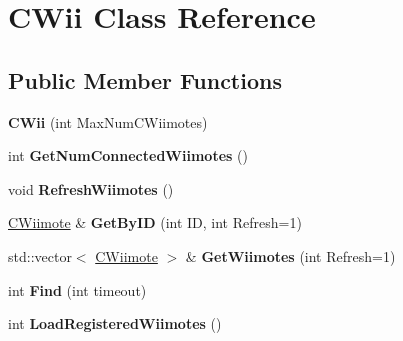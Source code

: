 \hypertarget{class_c_wii}{\section{\-C\-Wii \-Class \-Reference}
\label{class_c_wii}
}
\subsection*{\-Public \-Member \-Functions}
\begin{DoxyCompactItemize}
\item 
\hypertarget{class_c_wii_af61aa748b5c06d551d2e0ca4254f815d}{{\bfseries \-C\-Wii} (int \-Max\-Num\-C\-Wiimotes)}\label{class_c_wii_af61aa748b5c06d551d2e0ca4254f815d}

\item 
\hypertarget{class_c_wii_a0e0000682a9469cabc60b6107631fec8}{int {\bfseries \-Get\-Num\-Connected\-Wiimotes} ()}\label{class_c_wii_a0e0000682a9469cabc60b6107631fec8}

\item 
\hypertarget{class_c_wii_a1ad5ec6adb3939eb2bda5596fb7d6f4a}{void {\bfseries \-Refresh\-Wiimotes} ()}\label{class_c_wii_a1ad5ec6adb3939eb2bda5596fb7d6f4a}

\item 
\hypertarget{class_c_wii_aed6eb96fc61d08154aee79852def620c}{\hyperlink{class_c_wiimote}{\-C\-Wiimote} \& {\bfseries \-Get\-By\-I\-D} (int \-I\-D, int \-Refresh=1)}\label{class_c_wii_aed6eb96fc61d08154aee79852def620c}

\item 
\hypertarget{class_c_wii_a9d3c9500516e13b496f22e1e2a1ca44e}{std\-::vector$<$ \hyperlink{class_c_wiimote}{\-C\-Wiimote} $>$ \& {\bfseries \-Get\-Wiimotes} (int \-Refresh=1)}\label{class_c_wii_a9d3c9500516e13b496f22e1e2a1ca44e}

\item 
\hypertarget{class_c_wii_aee1843485afecca45a788df92a56941f}{int {\bfseries \-Find} (int timeout)}\label{class_c_wii_aee1843485afecca45a788df92a56941f}

\item 
\hypertarget{class_c_wii_acbf1b4f880bf41293e44679cff430794}{int {\bfseries \-Load\-Registered\-Wiimotes} ()}\label{class_c_wii_acbf1b4f880bf41293e44679cff430794}


\end{DoxyCompactItemize}
